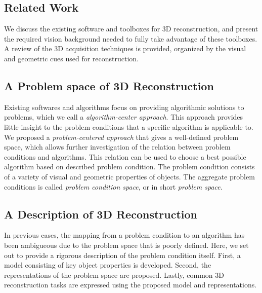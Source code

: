 \subsection{Related Work}
We discuss the existing software and toolboxes for 3D reconstruction, and present the required vision background needed to fully take advantage of these toolboxes. A review of the 3D acquisition techniques is provided, organized by the visual and geometric cues used for reconstruction.

\subsection{A Problem space of 3D Reconstruction}
Existing softwares and algorithms focus on providing algorithmic solutions to problems, which we call a \textit{algorithm-center approach}. This approach provides little insight to the problem conditions that a specific algorithm is applicable to. We proposed a \textit{problem-centered approach} that gives a well-defined problem space, which allows further investigation of the relation between problem conditions and algorithms. This relation can be used to choose a best possible algorithm based on described problem condition. The problem condition consists of a variety of visual and geometric properties of objects. The aggregate problem conditions is called \textit{problem condition space}, or in short \textit{problem space}.

\subsection{A Description of 3D Reconstruction}
In previous cases, the mapping from a problem condition to an algorithm has been ambigueous due to the problem space that is poorly defined. Here, we set out to provide a rigorous description of the problem condition itself. First, a model consisting of key object properties is developed. Second, the representations of the problem space are proposed. Lastly, common 3D reconstruction tasks are expressed using the proposed model and representations.


